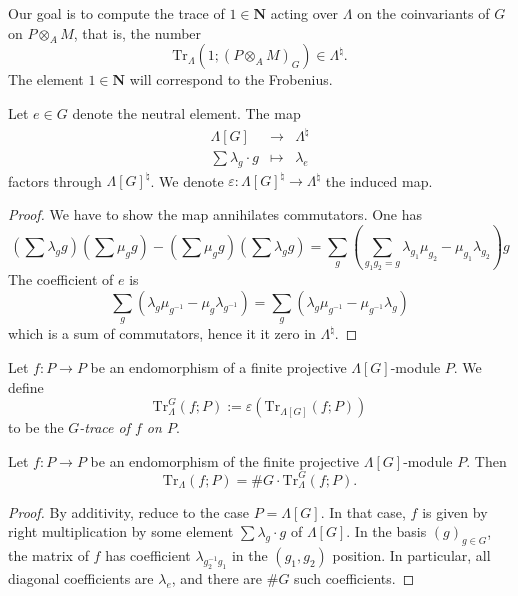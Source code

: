 \medskip\noindent
Our goal is to compute the trace of $1 \in \mathbf{N}$ acting over $\Lambda$
on the coinvariants of $G$ on $P \otimes_A M$, that is, the number
$$
\text{Tr}_{\Lambda}\left(1; \left(P \otimes_A M\right)_G\right) \in
\Lambda^\natural.
$$
The element $1\in \mathbf{N}$ will correspond to the Frobenius.

\begin{lemma}
\label{lemma-epsilon}
Let $e\in G$ denote the neutral element. The map
$$
\begin{matrix}
\Lambda[G] & \longrightarrow & \Lambda^{\natural}\\
\sum \lambda_g\cdot g &\longmapsto& \lambda_e
\end{matrix}
$$
factors through $\Lambda[G]^\natural$. We denote $\varepsilon:
\Lambda[G]^\natural\to \Lambda^\natural$ the induced map.
\end{lemma}

\begin{proof}
We have to show the map annihilates commutators. One has
$$
\left(\sum\lambda_g g\right)\left(\sum\mu_g g\right)-\left(\sum \mu_g
g\right)\left(\sum\lambda_g g\right)
= \sum_g\left(\sum_{g_1g_2=g}
\lambda_{g_1}\mu_{g_2}-\mu_{g_1}\lambda_{g_2}\right)g
$$
The coefficient of $e$ is
$$
\sum_g\left(\lambda_g\mu_{g^{-1}}-\mu_g\lambda_{g^{-1}}\right) =
\sum_g\left(\lambda_g\mu_{g^{-1}}-\mu_{g^{-1}}\lambda_g\right)
$$
which is a sum of commutators, hence it it zero in $\Lambda^\natural$.
\end{proof}

\begin{definition}
\label{definition-trace-G}
Let $f: P\to P$ be an
endomorphism of a finite projective $\Lambda[G]$-module
$P$. We define
$$
\text{Tr}_{\Lambda}^G(f; P) := \varepsilon\left(\text{Tr}_{\Lambda[G]}(f;
P)\right)
$$
to be the {\it $G$-trace of $f$ on $P$}.
\end{definition}

\begin{lemma}
\label{lemma-lambda-trace}
Let $f: P\to P$ be an endomorphism of the finite projective
$\Lambda[G]$-module $P$. Then
$$
\text{Tr}_{\Lambda}(f; P) = \# G \cdot \text{Tr}_\Lambda^G(f; P).
$$
\end{lemma}

\begin{proof}
By additivity, reduce to the case $P = \Lambda[G]$.
In that case, $f$ is given by
right multiplication by some element $\sum\lambda_g\cdot g$ of $\Lambda[G]$. In
the basis $(g)_{g \in G}$, the matrix of $f$ has coefficient
$\lambda_{g_2^{-1}g_1}$ in the $(g_1, g_2)$ position. In particular, all
diagonal coefficients are $\lambda_e$, and there are $\#G$ such coefficients.
\end{proof}

